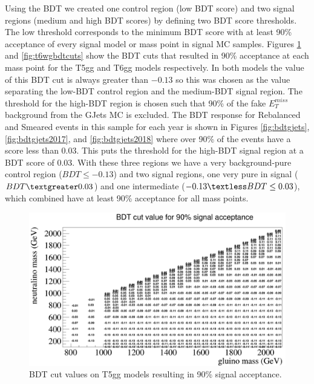 Using the BDT we created one control region (low BDT score) and two signal regions (medium and high BDT scores) by defining two BDT score thresholds.  The low threshold corresponds to the minimum BDT score with at least 90\% acceptance of every signal model or mass point in signal MC samples.  Figures \ref{fig:t5wgbdtcuts} and \ref{fig:t6wgbdtcuts} show the BDT cuts that resulted in 90\% acceptance at each mass point for the T5gg and T6gg models respectively.  In both models the value of this BDT cut is always greater than $-0.13$ so this was chosen as the value separating the low-BDT control region and the medium-BDT signal region.  The threshold for the high-BDT region is chosen such that 90\% of the fake $E^{miss}_T$ background from the GJets MC is excluded.  The BDT response for Rebalanced and Smeared events in this sample for each year is shown in Figures \ref{fig:bdtgjets}, \ref{fig:bdtgjets2017}, and \ref{fig:bdtgjets2018} where over 90\% of the events have a score less than $0.03$.  This puts the threshold for the high-BDT signal region at a BDT score of $0.03$.  With these three regions we have a very background-pure control region ($BDT \leq -0.13$) and two signal regions, one very pure in signal ($BDT\textgreater 0.03$) and one intermediate ($-0.13 \textless BDT \leq 0.03$), which combined have at least 90\% acceptance for all mass points.
\label{section:BDT}
\begin{figure}[h]
	\centering
	\includegraphics[width=1.5\linewidth,angle=90]{Figures/T5Wg_bdtcuts}
	\caption[BDT cut values on T5gg models resulting in 90\% signal acceptance.]{BDT cut values on T5gg models resulting in 90\% signal acceptance.}
	\label{fig:t5wgbdtcuts}
\end{figure}
